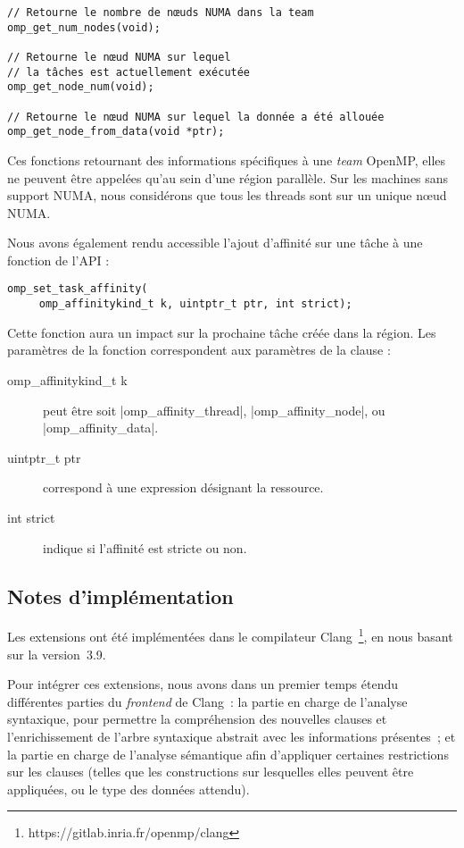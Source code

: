 \begin{lstlisting}
// Retourne le nombre de nœuds NUMA dans la team
omp_get_num_nodes(void);

// Retourne le nœud NUMA sur lequel
// la tâches est actuellement exécutée
omp_get_node_num(void);

// Retourne le nœud NUMA sur lequel la donnée a été allouée
omp_get_node_from_data(void *ptr);
\end{lstlisting}

Ces fonctions retournant des informations spécifiques à une \emph{team} OpenMP, elles ne peuvent être appelées qu'au sein d'une région parallèle.
Sur les machines sans support NUMA, nous considérons que tous les threads sont sur un unique nœud NUMA.

Nous avons également rendu accessible l'ajout d'affinité sur une tâche à une fonction de l'API :
\begin{lstlisting}
omp_set_task_affinity( 
     omp_affinitykind_t k, uintptr_t ptr, int strict);
\end{lstlisting}
Cette fonction aura un impact sur la prochaine tâche créée dans la région.
Les paramètres de la fonction correspondent aux paramètres de la clause :

\begin{description}
  \item [omp\_affinitykind\_t k] peut être soit |omp_affinity_thread|, |omp_affinity_node|, ou |omp_affinity_data|.
  \item [uintptr\_t ptr] correspond à une expression désignant la ressource.
  \item [int strict] indique si l'affinité est stricte ou non.
\end{description}


\subsection{Notes d'implémentation}

Les extensions ont été implémentées dans le compilateur Clang~\footnote{https://gitlab.inria.fr/openmp/clang}, en nous basant sur la version~3.9.

Pour intégrer ces extensions, nous avons dans un premier temps étendu différentes parties du \emph{frontend} de Clang~: la partie en charge de l'analyse syntaxique, pour permettre la compréhension des nouvelles clauses et l'enrichissement de l'arbre syntaxique abstrait avec les informations présentes~;
et la partie en charge de l'analyse sémantique afin d'appliquer certaines restrictions sur les clauses (telles que les constructions sur lesquelles elles peuvent être appliquées, ou le type des données attendu).


